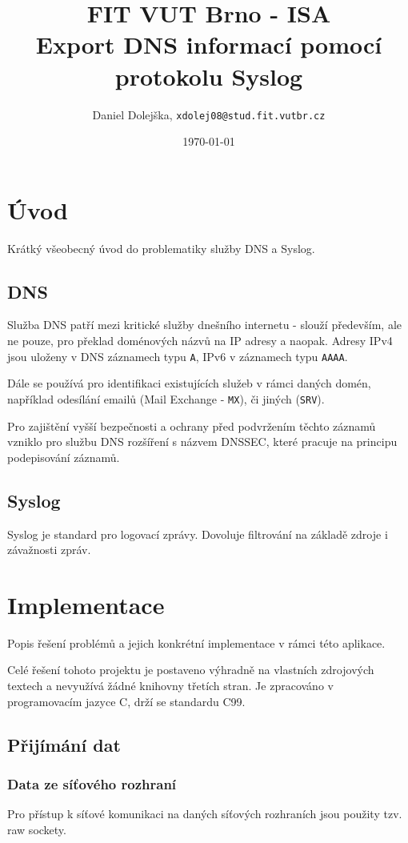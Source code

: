 \documentclass[11pt]{article}
\title{\textbf{FIT VUT Brno - ISA}\\
	Export DNS informací pomocí protokolu Syslog}
\author{Daniel Dolejška, \texttt{xdolej08@stud.fit.vutbr.cz}}
\date{\today}
\begin{document}
	
	\maketitle
	\tableofcontents
	
	
	\newpage
	
	\section{Úvod}
	Krátký všeobecný úvod do problematiky služby DNS a Syslog.
	
	\subsection{DNS}
	Služba DNS patří mezi kritické služby dnešního internetu - slouží především, ale ne pouze, pro překlad doménových názvů na IP adresy a naopak. Adresy IPv4 jsou uloženy v DNS záznamech typu \texttt{A}, IPv6 v záznamech typu \texttt{AAAA}\cite{RFC1035}.
	
	Dále se používá pro identifikaci existujících služeb v rámci daných domén, například odesílání emailů (Mail Exchange - \texttt{MX}), či jiných\cite{RFC2782} (\texttt{SRV}).
	
	Pro zajištění vyšší bezpečnosti a ochrany před podvržením těchto záznamů vzniklo pro službu DNS rozšíření s názvem DNSSEC, které pracuje na principu podepisování záznamů\cite{RFC4034}.
	
	\subsection{Syslog}
	Syslog je standard pro logovací zprávy\cite{RFC5424}. Dovoluje filtrování na základě zdroje i závažnosti zpráv.
	
	
	\section{Implementace}
	Popis řešení problémů a jejich konkrétní implementace v rámci této aplikace.
	
	Celé řešení tohoto projektu je postaveno výhradně na vlastních zdrojových textech a nevyužívá žádné knihovny třetích stran. Je zpracováno v programovacím jazyce C, drží se standardu C99.
	
	\subsection{Přijímání dat}
	\subsubsection{Data ze síťového rozhraní}
	Pro přístup k síťové komunikaci na daných síťových rozhraních jsou použity tzv. \textsf{raw sockety}.
	
\end{document}
